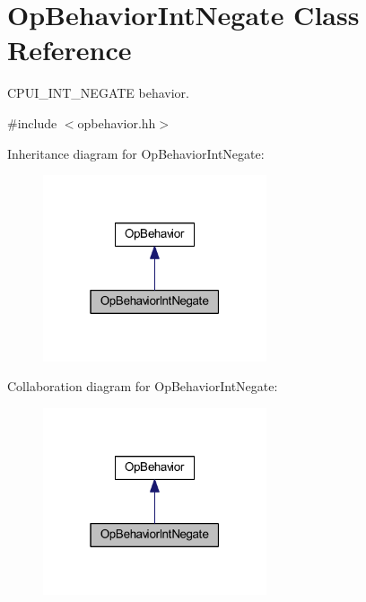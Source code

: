 \hypertarget{class_op_behavior_int_negate}{}\section{Op\+Behavior\+Int\+Negate Class Reference}
\label{class_op_behavior_int_negate}


C\+P\+U\+I\+\_\+\+I\+N\+T\+\_\+\+N\+E\+G\+A\+TE behavior.  




{\ttfamily \#include $<$opbehavior.\+hh$>$}



Inheritance diagram for Op\+Behavior\+Int\+Negate\+:
\nopagebreak
\begin{figure}[H]
\begin{center}
\leavevmode
\includegraphics[width=187pt]{class_op_behavior_int_negate__inherit__graph}
\end{center}
\end{figure}


Collaboration diagram for Op\+Behavior\+Int\+Negate\+:
\nopagebreak
\begin{figure}[H]
\begin{center}
\leavevmode
\includegraphics[width=187pt]{class_op_behavior_int_negate__coll__graph}
\end{center}
\end{figure}

